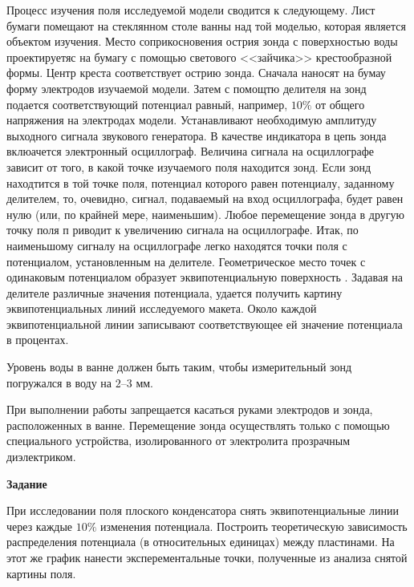 Процесс изучения поля исследуемой модели сводится к следующему. Лист бумаги помещают на стеклянном столе ванны над той моделью, которая является объектом изучения. Место соприкосновения острия зонда с поверхностью воды проектируетяс на бумагу с помощью светового <<зайчика>> крестообразной формы. Центр креста соответствует острию зонда. Сначала наносят на бумау форму электродов изучаемой модели. Затем с помощтю делителя на зонд подается соответствующий потенциал равный, например, $10\%$ от общего напряжения на электродах модели. Устанавливают необходимую амплитуду выходного сигнала звукового генератора. В качестве индикатора в цепь зонда вклюачется электронный осциллограф. Величина сигнала на осциллографе зависит от того, в какой точке изучаемого поля находится зонд. Если зонд находтится в той точке поля, потенциал которого равен потенциалу, заданному делителем, то, очевидно, сигнал, подаваемый на вход осциллографа, будет равен нулю (или, по крайней мере, наименьшим). Любое перемещение зонда в другую точку поля п риводит к увеличению сигнала на осциллографе. Итак, по наименьшому сигналу на осциллографе легко находятся точки поля с потенциалом, установленным на делителе. Геометрическое место точек с одинаковым потенциалом образует эквипотенциальную поверхность . Задавая на делителе различные значения потенциала, удается получить картину эквипотенциальных линий исследуемого макета. Около каждой эквипотенциальной линии записывают соответствующее ей значение потенциала в процентах.

Уровень воды в ванне должен быть таким, чтобы измерительный зонд погружался в воду на $2$--$3$ мм.

При выполнении работы запрещается касаться руками электродов и зонда, расположенных в ванне. Перемещение зонда осуществлять только с помощью специального устройства, изолированного от электролита прозрачным диэлектриком.

\textbf{Задание}

При исследовании поля плоского конденсатора снять эквипотенциальные линии через каждые $10\%$ изменения потенциала. Построить теоретическую зависимость распределения потенциала (в относительных единицах) между пластинами. На этот же график нанести эксперементальные точки, полученные из анализа снятой картины поля.